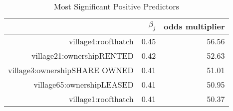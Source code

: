 \begin{table}[ht]
\centering
\begin{tabular}{rrr}
  \hline
 & $\beta_j$ & odds multiplier \\ 
  \hline
village4:roofthatch & 0.45 & 56.56 \\ 
  village21:ownershipRENTED & 0.42 & 52.63 \\ 
  village3:ownershipSHARE OWNED & 0.41 & 51.01 \\ 
  village65:ownershipLEASED & 0.41 & 50.95 \\ 
  village1:roofthatch & 0.41 & 50.37 \\ 
   \hline
\end{tabular}
\caption{Most Significant Positive Predictors} 
\label{tab:pos}
\end{table}
